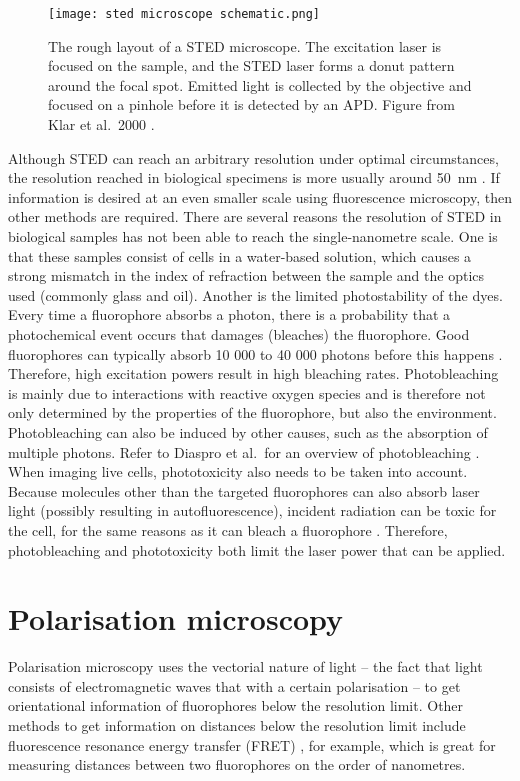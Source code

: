 \begin{figure}
	\centering
	\texttt{[image: sted microscope schematic.png]}
	\caption{
		The rough layout of a STED microscope. The excitation laser is focused on the sample, and the STED laser forms a donut pattern around the focal spot. Emitted light is collected by the objective and focused on a pinhole before it is detected by an APD. Figure from Klar et al.~2000 \cite{Klar2000}.
	}
	\label{fig:sted microscope}
\end{figure}

Although STED can reach an arbitrary resolution under optimal circumstances, the resolution reached in biological specimens is more usually around 50~nm \cite{Wildanger2012,Muller2012}. If information is desired at an even smaller scale using fluorescence microscopy, then other methods are required.
There are several reasons the resolution of STED in biological samples has not been able to reach the single-nanometre scale. One is that these samples consist of cells in a water-based solution, which causes a strong mismatch in the index of refraction between the sample and the optics used (commonly glass and oil). Another is the limited photostability of the dyes. Every time a fluorophore absorbs a photon, there is a probability that a photochemical event occurs that damages (bleaches) the fluorophore. Good fluorophores can typically absorb 10 000 to 40 000 photons before this happens \cite{Lichtman2005}. Therefore, high excitation powers result in high bleaching rates. Photobleaching is mainly due to interactions with reactive oxygen species and is therefore not only determined by the properties of the fluorophore, but also the environment. Photobleaching can also be induced by other causes, such as the absorption of multiple photons. Refer to Diaspro et al.~for an overview of photobleaching \cite{Diaspro2006}. When imaging live cells, phototoxicity also needs to be taken into account. Because molecules other than the targeted fluorophores can also absorb laser light (possibly resulting in autofluorescence), incident radiation can be toxic for the cell, for the same reasons as it can bleach a fluorophore \cite{Lichtman2005}. Therefore, photobleaching and phototoxicity both limit the laser power that can be applied.


\section{Polarisation microscopy}

Polarisation microscopy uses the vectorial nature of light -- the fact that light consists of electromagnetic waves that with a certain polarisation -- to get orientational information of fluorophores below the resolution limit. Other methods to get information on distances below the resolution limit  include fluorescence resonance energy transfer (FRET) \cite{Lerner2021}, for example, which is great for measuring distances between two fluorophores on the order of nanometres.

